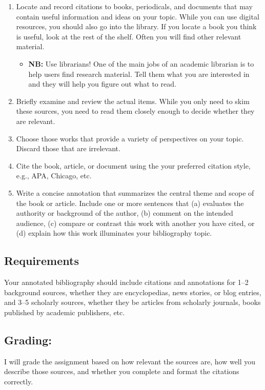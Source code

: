 \documentclass[10pt, oneside]{article}
\begin{document}
\begin{enumerate}

\item{Locate and record citations to books, periodicals, and documents that may contain useful information and ideas on your topic. While you can use digital resources, you should also go into the library. If you locate a book you think is useful, look at the rest of the shelf. Often you will find other relevant material.}
\begin{itemize}
\item \textbf{NB:} Use librarians! One of the main jobs of an academic librarian is to help users find research material. Tell them what you are interested in and they will help you figure out what to read. 
\end{itemize}
\item{Briefly examine and review the actual items. While you only need to skim these sources, you need to read them closely enough to decide whether they are relevant.} 

\item{Choose those works that provide a variety of perspectives on your topic. Discard those that are irrelevant.}

\item{Cite the book, article, or document using the your preferred citation style, e.g., APA, Chicago, etc.}

\item{Write a concise annotation that summarizes the central theme and scope of the book or article. Include one or more sentences that (a) evaluates the authority or background of the author, (b) comment on the intended audience, (c) compare or contrast this work with another you have cited, or (d) explain how this work illuminates your bibliography topic.}
\end{enumerate}

\subsection*{Requirements} Your annotated bibliography should include citations and annotations for 1--2 background sources, whether they are encyclopedias, news stories, or blog entries, and 3--5 scholarly sources, whether they be articles from scholarly journals, books published by academic publishers, etc. 

\subsection*{Grading:} I will grade the assignment based on how relevant the sources are, how well you describe those sources, and whether you complete and format the citations correctly. 
\end{document}
